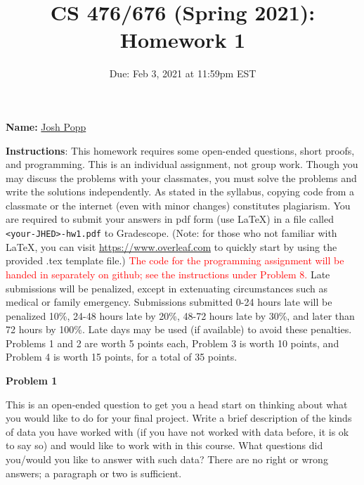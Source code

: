 \documentclass[letterpaper, 11pt]{article}
\title{CS 476/676 (Spring 2021): Homework 1}
\author{}
\date{Due: Feb 3, 2021 at 11:59pm EST}
\begin{document}
\maketitle

\setlength{\parindent}{0em}
\setlength{\parskip}{0.8em}

\Large\textbf{Name:} \underline{\hspace{30pt} Josh Popp \hspace{30pt}}
\vspace{1em}

\textbf{Instructions}: This homework requires some open-ended questions, short proofs, and
programming. This is an individual assignment, not group work. Though you may
discuss the problems with your classmates, you must solve the problems and
write the solutions independently. As stated in the syllabus, copying code
from a classmate or the internet (even with minor changes) constitutes
plagiarism. You are required to submit your answers in pdf form (use \LaTeX)
in a file called \texttt{<your-JHED>-hw1.pdf} to Gradescope. (Note: for those who not familiar with \LaTeX, you can visit \url{https://www.overleaf.com} to quickly start by using the provided .tex template file.) \textcolor{red}{The code for the programming assignment will be handed in separately on
github; see the instructions under Problem 8.}
Late submissions will be penalized, except in extenuating circumstances such
as medical or family emergency. Submissions submitted 0-24 hours late will be
penalized 10\%, 24-48 hours late by 20\%, 48-72 hours late by 30\%, and later
than 72 hours by 100\%. Late days may be used (if available) to avoid these penalties. Problems 1 and 2 are worth 5 points each, Problem 3 is worth 10 points, and Problem 4 is worth 15 points, for a total of 35 points.

\vspace{1em}

{\Large\textbf{Problem 1}}

This is an open-ended question to get you a head start on thinking about what you would like to do for your final project. Write a brief description of the kinds of data you have worked with (if you have not worked with data before, it is ok to say so) and would like to work with in this course. What questions did you/would you like to answer with such data? There are no right or wrong answers; a paragraph or two is sufficient.
\end{document}
